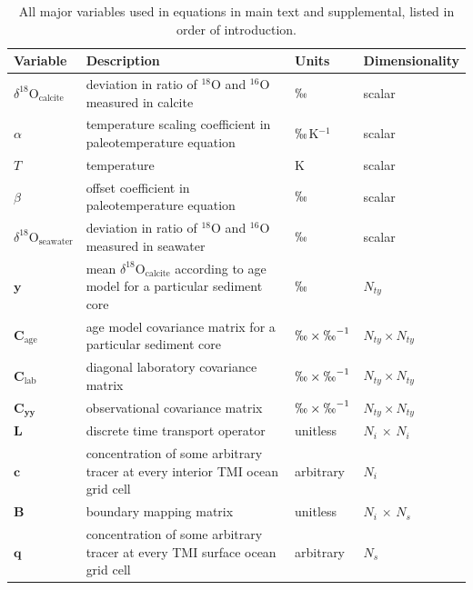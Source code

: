 \documentclass[draft]{agujournal2019}
\begin{document}
\begin{longtable}{| p{0.75in}|p{3.5in}|p{1in}|p{1in} |}

\caption{All major variables used in equations in main text and supplemental, listed in order of introduction. \label{var}}\\

\hline
 \textbf{Variable} & \textbf{Description} & \textbf{Units} & \textbf{Dimensionality} \\ 
  \hline
  \hline
  $\delta^{18}\mathrm{O}_{\mathrm{calcite}}$ & deviation in ratio of $^{18}\mathrm{O}$ and $^{16}\mathrm{O}$ measured in calcite & $\permil$ & scalar \\
  \hline
  $\alpha$ & temperature scaling coefficient in paleotemperature equation & $\permil$K$^{-1}$ & scalar \\
  \hline
  $T$ & temperature & K & scalar\\
  \hline
  $\beta$ & offset coefficient in paleotemperature equation & $\permil$ & scalar \\                    \hline
  $\delta^{18}\mathrm{O}_{\mathrm{seawater}}$ & deviation in ratio of $^{18}\mathrm{O}$ and $^{16}\mathrm{O}$ measured in seawater & $\permil$ & scalar \\
  \hline
$\mathbf{y}$ & mean $\delta^{18}\mathrm{O}_{\mathrm{calcite}}$ according to age model for a particular sediment core & $\permil$& $N_{ty}$ \\
\hline  
  $\mathbf{C}_{\mathrm{age}}$ & age model covariance matrix for a particular sediment core & $\permil\times \permil^{-1}$ & $N_{ty}\times N_{ty}$ \\
  \hline
    $\mathbf{C}_{\mathrm{lab}}$ & diagonal laboratory covariance matrix & $\permil\times \permil^{-1}$  & $N_{ty}\times N_{ty}$\\
  \hline
  $\mathbf{C_{yy}}$ & observational covariance matrix & $\permil\times \permil^{-1}$ & $N_{ty}\times N_{ty}$\\
  \hline
  $\mathbf{L}$ & discrete time transport operator \cite{Gebbie-Huybers-2012:mean} & unitless & $N_i$ $\times$ $N_i$\\
  \hline
  $\mathbf{c}$ & concentration of some arbitrary tracer at every interior TMI ocean grid cell & arbitrary & $N_i$ \\
  \hline
  $\mathbf{B}$ & boundary mapping matrix & unitless & $N_i$ $\times $ $N_{s}$ \\
  \hline
  $\mathbf{q}$ & concentration of some arbitrary tracer at every TMI surface ocean grid cell & arbitrary & $N_s$ \\

\end{longtable}
\end{document}
